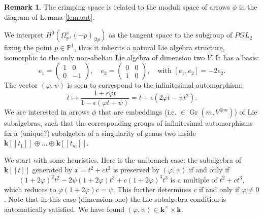 \documentclass[11pt]{amsart}
\newcommand{\PP}{\mathbb P}
\renewcommand{\k}{\mathbf k}
\theoremstyle{plain}
\theoremstyle{definition}
\newtheorem{rem}[thm]{Remark}
\begin{document}
\begin{rem}
 The crimping space is related to the moduli space of arrows $\phi$ in the diagram of Lemma \ref{lem:aut}.
 
 We interpret $H^0(\Omega_{\PP^1}^\vee(-p)_{|2p})$ as the tangent space to the subgroup of $PGL_2$ fixing the point $p\in\PP^1$, thus it inherits a natural Lie algebra structure, isomorphic to the only non-abelian Lie algebra of dimension two $V$. It has a basis: \[e_1=\begin{pmatrix} 1 & 0 \\ 0 & -1\end{pmatrix}, \quad e_2=\begin{pmatrix} 0 & 0 \\ 1 & 0\end{pmatrix},\quad \text{with } [e_1,e_2]=-2e_2.\]
 The vector $(\varphi,\psi)$ is seen to correspond to the infinitesimal automorphism: \[t\mapsto\frac{1+\epsilon\varphi t}{1-\epsilon(\varphi t+\psi)}=t+\epsilon(2\varphi t-\psi t^2).\]
 We are interested in arrows $\phi$ that are embeddings (i.e. $\in\operatorname{Gr}(m,V^{\oplus m})$) of Lie subalgebras, such that the corresponding groups of infinitesimal automorphisms fix a (unique?) subalgebra of a singularity of genus two inside $\k[\![t_1]\!]\oplus\ldots\oplus\k[\![t_m]\!]$.
 
 We start with some heuristics. Here is the unibranch case: the subalgebra of $\k[\![t]\!]$ generated by $x=t^2+ct^3$ is preserved by $(\varphi,\psi)$ if and only if
 \[(1+2\varphi)^2t^2-2\psi(1+2\varphi)t^3+c(1+2\varphi)^3t^3\text{ is a multiple of } t^2+ct^3,\]
 which reduces to $\varphi(1+2\varphi)c=\psi$. This further determines $c$ if and only if $\varphi\neq 0$. Note that in this case (dimension one) the Lie subalgebra condition is automatically satisfied. We have found $(\varphi,\psi)\in\k^\times\times\k$.
 

\end{rem}
\end{document}
